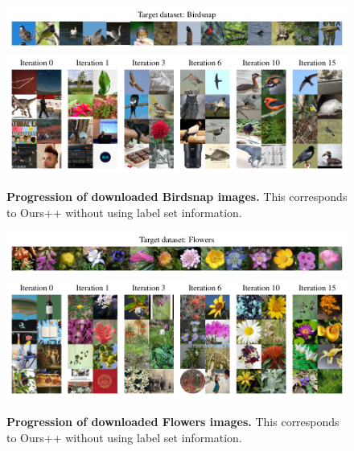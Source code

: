 \begin{figure}
    \centering
    \includegraphics{figures/birdsnap_targets.pdf} \\
    \vspace{-0.8em}
    \includegraphics{figures/birdsnap-progression-1146-2col.pdf}
    \caption{\textbf{Progression of downloaded Birdsnap images.} This corresponds to Ours++ without using label set information. }
    \label{fig:birdsnap_progression}
\end{figure}

\begin{figure}
    \centering
    \includegraphics{figures/flowers_targets.pdf} \\
    \vspace{-0.8em}
    \includegraphics{figures/flowers-progression-1150-2col.pdf}
    \caption{\textbf{Progression of downloaded Flowers images.} This corresponds to Ours++ without using label set information. }
    \label{fig:flowers_progression}
\end{figure}


